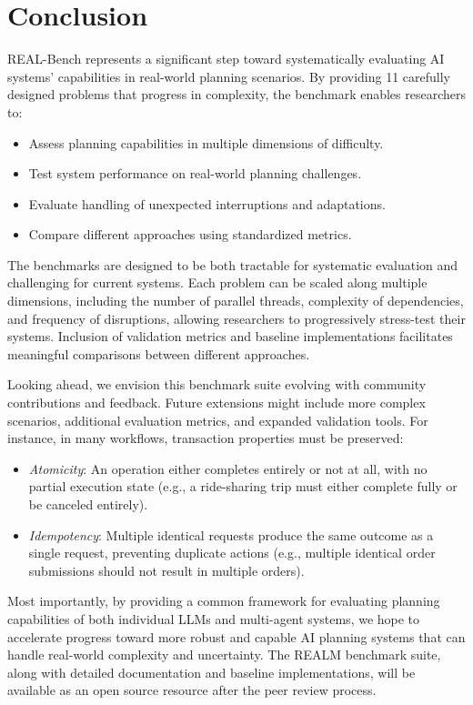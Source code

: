 \section{Conclusion}

REAL-Bench represents a significant step toward systematically evaluating AI systems' capabilities in real-world planning scenarios. By providing 11 carefully designed problems that progress in complexity, the benchmark enables researchers to:

\begin{itemize}[leftmargin=1.0em, topsep=-.0em, parsep=-.0em, label=-]
\item Assess planning capabilities in multiple dimensions of difficulty.
\item Test system performance on real-world planning challenges.
\item Evaluate handling of unexpected interruptions and adaptations.
\item Compare different approaches using standardized metrics.
\end{itemize}

The benchmarks are designed to be both tractable for systematic evaluation and challenging for current systems. Each problem can be scaled along multiple dimensions, including the number of parallel threads, complexity of dependencies, and frequency of disruptions, allowing researchers to progressively stress-test their systems. Inclusion of validation metrics and baseline implementations facilitates meaningful comparisons between different approaches.

Looking ahead, we envision this benchmark suite evolving with community contributions and feedback. Future extensions might include more complex scenarios, additional evaluation metrics, and expanded validation tools. For instance, in many workflows, transaction properties must be preserved:

\begin{itemize}[leftmargin=1.0em, topsep=-.0em, parsep=-.0em, label=-]
   \item \textit{Atomicity}: An operation either completes entirely or not at all, with no partial execution state (e.g., a ride-sharing trip must either complete fully or be canceled entirely).
   \item \textit{Idempotency}: Multiple identical requests produce the same outcome as a single request, preventing duplicate actions (e.g., multiple identical order submissions should not result in multiple orders).
\end{itemize}

Most importantly, by providing a common framework for evaluating planning capabilities of both individual LLMs and multi-agent systems, we hope to accelerate progress toward more robust and capable AI planning systems that can handle real-world complexity and uncertainty. The REALM benchmark suite, along with detailed documentation and baseline implementations, will be available as an open source resource after the peer review process.

